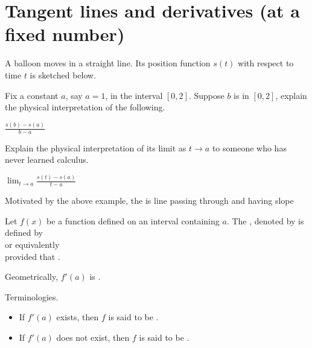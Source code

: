 \documentclass[../main.tex]{subfiles}
\begin{document}
 \section{Tangent lines and derivatives (at a fixed number)}

  A balloon moves in a straight line. Its position function \(s(t)\) with respect to time \(t\) is sketched below. 

  \begin{center}
    
  \end{center}

  Fix a constant \(a\), say \(a = 1\), in the interval \([0,2]\). Suppose \(b\) is in \([0,2]\), explain the physical interpretation of the following. 

  \(\frac{s(b) - s(a)}{b - a}\)

  Explain the physical interpretation of its limit as \(t \to a\) to someone who has never learned calculus. 

  \(\lim_{t \to a} \frac{s(t) - s(a)}{t - a}\)

  Motivated by the above example, the  is \underline{\hspace{2cm}} line passing through \underline{\hspace{2in}} and having slope 

  \begin{mdframed}[style=simple]
    Let \(f(x)\) be a function defined on an \underline{\hspace{1in}} interval containing \(a\). The , denoted by  is defined by
    \begin{equation}\label{eq:def-derivative-1}
    \end{equation}
    or equivalently 
    \begin{equation}\label{eq:def-derivative-2}
    \end{equation}
    provided that \underline{\hspace{2in}}.

  \end{mdframed}

  \faStar{} Geometrically, \(f'(a)\) is \underline{\hspace{5in}}.

  Terminologies. 
  \begin{itemize}
    \item If \(f'(a)\) exists, then \(f\) is said to be .
    \item If \(f'(a)\) does not exist, then \(f\) is said to be .
  \end{itemize}
\end{document}
